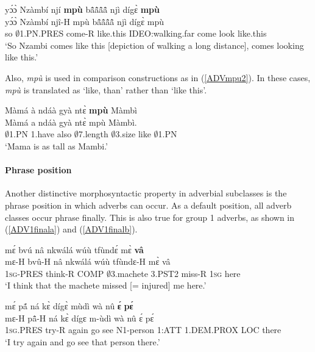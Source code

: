 \begin{exe} 
\ex\label{ADVmpu1}
  \glll yɔ́ɔ̀ Nzàmbí njí {\bfseries mpù} bã̂ã̂ã̂ã̂ njì dígɛ̀ {\bfseries mpù} \\
       yɔ́ɔ̀ Nzàmbí njî-H mpù bã̂ã̂ã̂ã̂ njì dígɛ̀ mpù \\
        so $\emptyset$1.PN.PRES come-R like.this IDEO:walking.far come look like.this \\
    \trans `So Nzambi comes like this [depiction of walking a long distance], comes looking like this.'
\end{exe}

\noindent   Also, {\itshape mpù} is used in comparison constructions as in (\ref{ADVmpu2}). In these cases, {\itshape mpù} is translated as `like, than' rather than `like this'.

\begin{exe} 
\ex\label{ADVmpu2}
  \glll Màmá à ndáà gyà ntɛ̀ {\bfseries mpù} Màmbì \\
       Màmá a ndáà gyà ntɛ̀ mpù Màmbì.  \\
        $\emptyset$1.PN  1.have also $\emptyset$7.length $\emptyset$3.size like $\emptyset$1.PN \\
    \trans `Mama is as tall as Mambi.'
\end{exe}
\fi %

\paragraph{Phrase position} Another distinctive morphosyntactic property in adverbial subclasses is the phrase position in which adverbs can occur. As a default position, all adverb classes occur phrase finally. This is also true for group 1 adverbs, as shown in (\ref{ADV1finala}) and (\ref{ADV1finalb}).

\begin{exe} 
\ex\label{ADV1finala}
  \glll    mɛ́ bvú nâ nkwálá wúù tfùndɛ́ mɛ̀ {\bfseries vâ} \\
           mɛ-H bvû-H nâ nkwálá wúù tfùndɛ-H mɛ̀ vâ \\
              1\textsc{sg}-PRES think-R COMP $\emptyset$3.machete 3.PST2 miss-R 1\textsc{sg} here \\
    \trans `I think that the machete missed [= injured] me here.'
\end{exe}

\begin{exe} 
\ex\label{ADV1finalb}
  \glll mɛ́ pã́ ná kɛ̀ dígɛ̀ mùdì wà nû {\bfseries ɛ́} {\bfseries pɛ́} \\
        mɛ-H pã̂-H ná kɛ̀ dígɛ m-ùdì wà nû ɛ́ pɛ́ \\
        1\textsc{sg}.PRES try-R again go see N1-person 1:ATT 1.DEM.PROX LOC there \\
    \trans `I try again and go see that person there.'
\end{exe}


